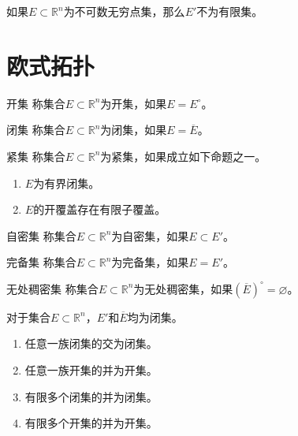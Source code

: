 \documentclass[lang = cn, scheme = chinese, thmcnt = section]{elegantbook}
\newcommand{\R}{\mathbb{R}}            %
\newcommand{\sub}{\subset}             %
\begin{document}
\begin{exercise}
	如果$E\sub\R^n$为不可数无穷点集，那么$E'$不为有限集。
\end{exercise}

\section{欧式拓扑}

\begin{definition}{开集}
	称集合$E\sub\R^n$为开集，如果$E=E^{\circ}$。
\end{definition}

\begin{definition}{闭集}
	称集合$E\sub\R^n$为闭集，如果$E=\overline{E}$。
\end{definition}

\begin{definition}{紧集}
	称集合$E\sub\R^n$为紧集，如果成立如下命题之一。
	\begin{enumerate}
		\item $E$为有界闭集。
		\item $E$的开覆盖存在有限子覆盖。
	\end{enumerate}
\end{definition}

\begin{definition}{自密集}
	称集合$E\sub\R^n$为自密集，如果$E\sub E'$。
\end{definition}

\begin{definition}{完备集}
	称集合$E\sub\R^n$为完备集，如果$E=E'$。
\end{definition}

\begin{definition}{无处稠密集}
	称集合$E\sub\R^n$为无处稠密集，如果$(\overline{E})^\circ=\varnothing$。
\end{definition}

\begin{theorem}
	对于集合$E\sub\R^n$，$E'$和$\overline{E}$均为闭集。
\end{theorem}

\begin{proposition}
	\begin{enumerate}
		\item 任意一族闭集的交为闭集。
		\item 任意一族开集的并为开集。
		\item 有限多个闭集的并为闭集。
		\item 有限多个开集的并为开集。
	\end{enumerate}
\end{proposition}
\end{document}
